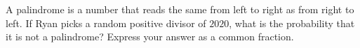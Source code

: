 A palindrome is a number that reads the same from left to right as from right to left. If Ryan picks a random positive divisor of $2020$, what is the probability that it is not a palindrome? Express your answer as a common fraction.
